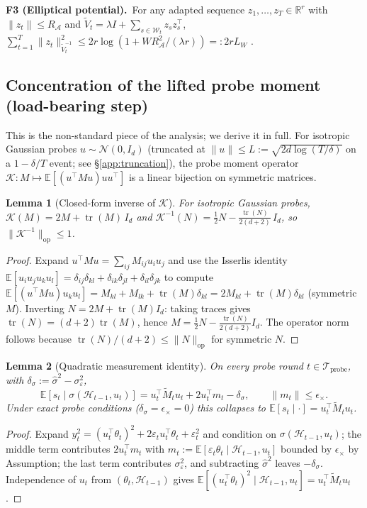 \documentclass{article}
\newcommand{\R}{\mathbb{R}}
\newcommand{\E}{\mathbb{E}}
\newcommand{\op}{\mathrm{op}}
\newcommand{\cA}{\mathcal{A}}
\newcommand{\cH}{\mathcal{H}}
\newcommand{\cW}{\mathcal{W}}
\newcommand{\cTprobe}{\mathcal{T}_{\mathrm{probe}}}
\DeclareMathOperator{\tr}{tr}
\newtheorem{lemma}{Lemma}
\begin{document}
\noindent\textbf{F3 (Elliptical potential).}\ For any adapted sequence
$z_1,\dots,z_T\in\R^r$ with $\|z_t\|\le R_\cA$ and
$\widetilde V_t = \lambda I + \sum_{s\in\cW_t} z_s z_s^\top$,
$\sum_{t=1}^T \|z_t\|^2_{\widetilde V_t^{-1}}
\le 2r\log(1 + W R_\cA^2/(\lambda r)) =: 2r L_W$
\citep[Lem.~11]{abbasi2011improved}.

\subsection{Concentration of the lifted probe moment (load-bearing step)}
\label{app:concentration_proof}

This is the non-standard piece of the analysis; we derive it in full.
For isotropic Gaussian probes $u\sim\mathcal N(0,I_d)$ (truncated at
$\|u\|\le L := \sqrt{2d\log(T/\delta)}$ on a $1-\delta/T$ event;
see \S\ref{app:truncation}), the probe moment operator
$\mathcal K: M\mapsto\E[(u^\top Mu)uu^\top]$ is a linear bijection on
symmetric matrices.

\begin{lemma}[Closed-form inverse of $\mathcal K$]
\label{lem:K_inverse}
For isotropic Gaussian probes,
$\mathcal K(M) = 2M + \tr(M)\,I_d$ and
$\mathcal K^{-1}(N) = \tfrac12 N - \tfrac{\tr(N)}{2(d+2)}\,I_d$, so
$\|\mathcal K^{-1}\|_\op \le 1$.
\end{lemma}
\begin{proof}
Expand $u^\top M u = \sum_{ij} M_{ij} u_i u_j$ and use the Isserlis
identity $\E[u_i u_j u_k u_l] = \delta_{ij}\delta_{kl} +
\delta_{ik}\delta_{jl} + \delta_{il}\delta_{jk}$ to compute
$\E[(u^\top M u)u_k u_l] = M_{kl} + M_{lk} + \tr(M)\delta_{kl} = 2M_{kl}
+ \tr(M)\delta_{kl}$ (symmetric $M$). Inverting
$N = 2M + \tr(M)I_d$: taking traces gives $\tr(N) = (d+2)\tr(M)$, hence
$M = \tfrac12 N - \tfrac{\tr(N)}{2(d+2)}I_d$. The operator norm
follows because $\tr(N)/(d+2)\le\|N\|_\op$ for symmetric $N$.
\end{proof}

\begin{lemma}[Quadratic measurement identity]
\label{lem:quad_conf}
On every probe round $t\in\cTprobe$, with
$\delta_\sigma := \hat\sigma^2 - \sigma_\varepsilon^2$,
\[
\E[s_t\mid\sigma(\cH_{t-1},u_t)]
= u_t^\top \widetilde M_t u_t + 2 u_t^\top m_t
- \delta_\sigma,\qquad \|m_t\|\le\epsilon_\times.
\]
Under exact probe conditions ($\delta_\sigma=\epsilon_\times=0$) this
collapses to $\E[s_t\mid\cdot] = u_t^\top\widetilde M_t u_t$.
\end{lemma}
\begin{proof}
Expand $y_t^2 = (u_t^\top\theta_t)^2 + 2\varepsilon_t u_t^\top\theta_t
+ \varepsilon_t^2$ and condition on $\sigma(\cH_{t-1},u_t)$; the middle
term contributes $2u_t^\top m_t$ with
$m_t := \E[\varepsilon_t\theta_t\mid\cH_{t-1},u_t]$ bounded by
$\epsilon_\times$ by Assumption; the last term contributes
$\sigma_\varepsilon^2$, and subtracting $\hat\sigma^2$ leaves
$-\delta_\sigma$. Independence of $u_t$ from $(\theta_t,\cH_{t-1})$
gives $\E[(u_t^\top\theta_t)^2\mid\cH_{t-1},u_t] = u_t^\top\widetilde M_t u_t$.
\end{proof}
\end{document}
